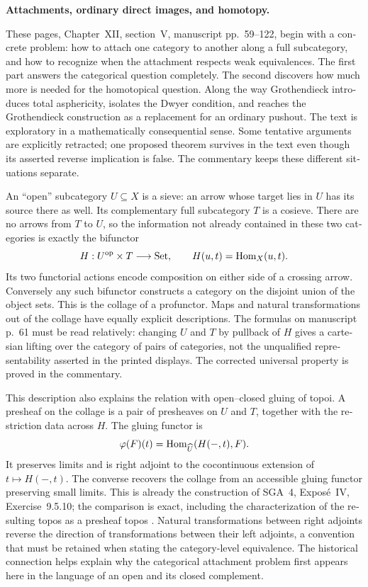 \begin{otherlanguage}{english}
\begingroup
{}
\noindent\textbf{Attachments, ordinary direct images, and homotopy.}

These pages, Chapter~XII, section~V, manuscript pp.~59--122, begin with a concrete problem: how to attach one category to another along a full subcategory, and how to recognize when the attachment respects weak equivalences. The first part answers the categorical question completely. The second discovers how much more is needed for the homotopical question. Along the way Grothendieck introduces total asphericity, isolates the Dwyer condition, and reaches the Grothendieck construction as a replacement for an ordinary pushout. The text is exploratory in a mathematically consequential sense. Some tentative arguments are explicitly retracted; one proposed theorem survives in the text even though its asserted reverse implication is false. The commentary keeps these different situations separate.

An ``open'' subcategory $U\subseteq X$ is a sieve: an arrow whose target lies in $U$ has its source there as well. Its complementary full subcategory $T$ is a cosieve. There are no arrows from $T$ to $U$, so the information not already contained in these two categories is exactly the bifunctor
\[
 H:U^{\mathrm{op}}\times T\longrightarrow\mathrm{Set},
 \qquad H(u,t)=\mathrm{Hom}_X(u,t).
\]
Its two functorial actions encode composition on either side of a crossing arrow. Conversely any such bifunctor constructs a category on the disjoint union of the object sets. This is the collage of a profunctor. Maps and natural transformations out of the collage have equally explicit descriptions. The formulas on manuscript p.~61 must be read relatively: changing $U$ and $T$ by pullback of $H$ gives a cartesian lifting over the category of pairs of categories, not the unqualified representability asserted in the printed displays. The corrected universal property is proved in the commentary.

This description also explains the relation with open--closed gluing of topoi. A presheaf on the collage is a pair of presheaves on $U$ and $T$, together with the restriction data across $H$. The gluing functor is
\[
 \varphi(F)(t)=\mathrm{Hom}_{\widehat U}(H(-,t),F).
\]
It preserves limits and is right adjoint to the cocontinuous extension of $t\mapsto H(-,t)$. The converse recovers the collage from an accessible gluing functor preserving small limits. This is already the construction of SGA~4, Expos\'e~IV, Exercise~9.5.10; the comparison is exact, including the characterization of the resulting topos as a presheaf topos \citep{SGA4I1972}. Natural transformations between right adjoints reverse the direction of transformations between their left adjoints, a convention that must be retained when stating the category-level equivalence. The historical connection helps explain why the categorical attachment problem first appears here in the language of an open and its closed complement.


\end{otherlanguage}
